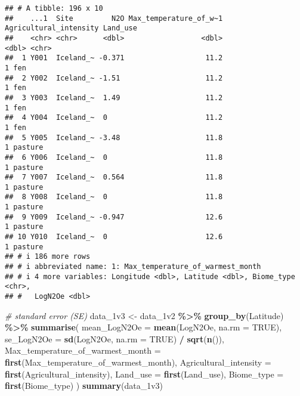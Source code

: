 \documentclass[
]{article}
\newenvironment{Shaded}{\begin{snugshade}}{\end{snugshade}}
\newcommand{\AttributeTok}[1]{\textcolor[rgb]{0.13,0.29,0.53}{#1}}
\newcommand{\CommentTok}[1]{\textcolor[rgb]{0.56,0.35,0.01}{\textit{#1}}}
\newcommand{\ConstantTok}[1]{\textcolor[rgb]{0.56,0.35,0.01}{#1}}
\newcommand{\FunctionTok}[1]{\textcolor[rgb]{0.13,0.29,0.53}{\textbf{#1}}}
\newcommand{\NormalTok}[1]{#1}
\newcommand{\OtherTok}[1]{\textcolor[rgb]{0.56,0.35,0.01}{#1}}
\newcommand{\SpecialCharTok}[1]{\textcolor[rgb]{0.81,0.36,0.00}{\textbf{#1}}}
\begin{document}
\begin{verbatim}
## # A tibble: 196 x 10
##    ...1  Site         N2O Max_temperature_of_w~1 Agricultural_intensity Land_use
##    <chr> <chr>      <dbl>                  <dbl>                  <dbl> <chr>   
##  1 Y001  Iceland_~ -0.371                   11.2                      1 fen     
##  2 Y002  Iceland_~ -1.51                    11.2                      1 fen     
##  3 Y003  Iceland_~  1.49                    11.2                      1 fen     
##  4 Y004  Iceland_~  0                       11.2                      1 fen     
##  5 Y005  Iceland_~ -3.48                    11.8                      1 pasture 
##  6 Y006  Iceland_~  0                       11.8                      1 pasture 
##  7 Y007  Iceland_~  0.564                   11.8                      1 pasture 
##  8 Y008  Iceland_~  0                       11.8                      1 pasture 
##  9 Y009  Iceland_~ -0.947                   12.6                      1 pasture 
## 10 Y010  Iceland_~  0                       12.6                      1 pasture 
## # i 186 more rows
## # i abbreviated name: 1: Max_temperature_of_warmest_month
## # i 4 more variables: Longitude <dbl>, Latitude <dbl>, Biome_type <chr>,
## #   LogN2Oe <dbl>
\end{verbatim}

\begin{Shaded}
\begin{Highlighting}[]
\CommentTok{\# standard error (SE) }
\NormalTok{data\_1v3 }\OtherTok{\textless{}{-}}\NormalTok{ data\_1v2 }\SpecialCharTok{\%\textgreater{}\%}
  \FunctionTok{group\_by}\NormalTok{(Latitude) }\SpecialCharTok{\%\textgreater{}\%}
  \FunctionTok{summarise}\NormalTok{(}
    \AttributeTok{mean\_LogN2Oe =} \FunctionTok{mean}\NormalTok{(LogN2Oe, }\AttributeTok{na.rm =} \ConstantTok{TRUE}\NormalTok{),}
    \AttributeTok{se\_LogN2Oe =} \FunctionTok{sd}\NormalTok{(LogN2Oe, }\AttributeTok{na.rm =} \ConstantTok{TRUE}\NormalTok{) }\SpecialCharTok{/} \FunctionTok{sqrt}\NormalTok{(}\FunctionTok{n}\NormalTok{()),}
    \AttributeTok{Max\_temperature\_of\_warmest\_month =} \FunctionTok{first}\NormalTok{(Max\_temperature\_of\_warmest\_month),}
    \AttributeTok{Agricultural\_intensity =} \FunctionTok{first}\NormalTok{(Agricultural\_intensity), }
    \AttributeTok{Land\_use =} \FunctionTok{first}\NormalTok{(Land\_use),  }
    \AttributeTok{Biome\_type =} \FunctionTok{first}\NormalTok{(Biome\_type)}
\NormalTok{  ) }
\FunctionTok{summary}\NormalTok{(data\_1v3)}
\end{Highlighting}
\end{Shaded}
\end{document}
